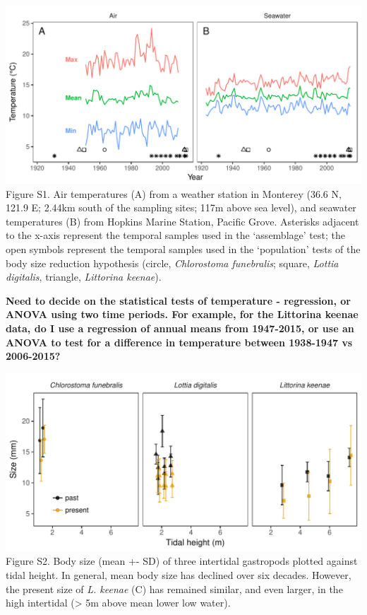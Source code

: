 \documentclass[11pt,]{article}
\begin{document}
\newpage 

\includegraphics{../../figs_ms/plot_temp_timeseries.pdf} Figure S1. Air
temperatures (A) from a weather station in Monterey (36.6 N, 121.9 E;
2.44km south of the sampling sites; 117m above sea level), and seawater
temperatures (B) from Hopkins Marine Station, Pacific Grove. Asterisks
adjacent to the x-axis represent the temporal samples used in the
`assemblage' test; the open symbols represent the temporal samples used
in the `population' tests of the body size reduction hypothesis (circle,
\emph{Chlorostoma funebralis}; square, \emph{Lottia digitalis},
triangle, \emph{Littorina keenae}).

\textbf{Need to decide on the statistical tests of temperature -
regression, or ANOVA using two time periods. For example, for the
Littorina keenae data, do I use a regression of annual means from
1947-2015, or use an ANOVA to test for a difference in temperature
between 1938-1947 vs 2006-2015?}

\newpage

\includegraphics{../../figs_ms/plot_size_era_tide_means.pdf} Figure S2.
Body size (mean +- SD) of three intertidal gastropods plotted against
tidal height. In general, mean body size has declined over six decades.
However, the present size of \emph{L. keenae} (C) has remained similar,
and even larger, in the high intertidal (\textgreater{} 5m above mean
lower low water).
\end{document}
